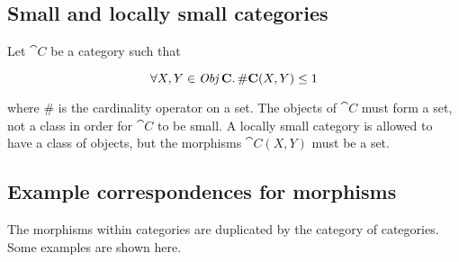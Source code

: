 \subsection{Small and locally small categories}

Let $\cat{C}$ be a category such that

\begin{equation*}
\forall X,Y \in \operatorname{\mathit{Obj}}{\mathbf{C}} \ldotp \# \mathbf{C}(X, Y) \leq 1
\end{equation*}

where $\#$ is the cardinality operator on a set. The objects of $\cat{C}$ must
form a set, not a class in order for $\cat{C}$ to be small. A locally small
category is allowed to have a class of objects, but the morphisms $\cat{C}(X, Y)$
must be a set.

\subsection{Example correspondences for morphisms}

The morphisms within categories are duplicated by the category of categories. Some examples are shown here.

